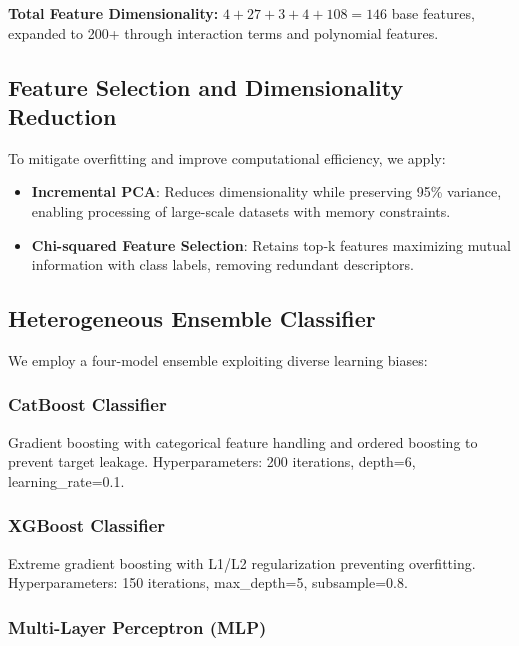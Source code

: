 \documentclass[runningheads]{llncs}
\begin{document}
\textbf{Total Feature Dimensionality:} $4 + 27 + 3 + 4 + 108 = 146$ base features, expanded to 200+ through interaction terms and polynomial features.

\subsection{Feature Selection and Dimensionality Reduction}

To mitigate overfitting and improve computational efficiency, we apply:

\begin{itemize}
    \item \textbf{Incremental PCA}: Reduces dimensionality while preserving 95\% variance, enabling processing of large-scale datasets with memory constraints.
    
    \item \textbf{Chi-squared Feature Selection}: Retains top-k features maximizing mutual information with class labels, removing redundant descriptors.
\end{itemize}

\subsection{Heterogeneous Ensemble Classifier}

We employ a four-model ensemble exploiting diverse learning biases:

\subsubsection{CatBoost Classifier}

Gradient boosting with categorical feature handling and ordered boosting to prevent target leakage. Hyperparameters: 200 iterations, depth=6, learning\_rate=0.1.

\subsubsection{XGBoost Classifier}

Extreme gradient boosting with L1/L2 regularization preventing overfitting. Hyperparameters: 150 iterations, max\_depth=5, subsample=0.8.

\subsubsection{Multi-Layer Perceptron (MLP)}
\end{document}
